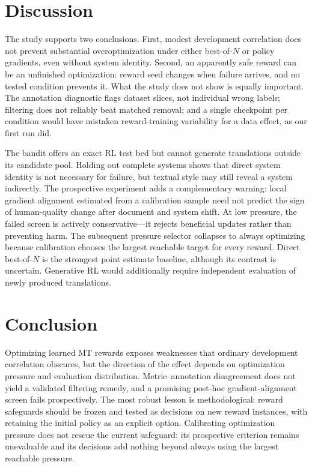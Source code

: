 \documentclass[11pt]{article}
\begin{document}
\section{Discussion}

The study supports two conclusions.  First, modest development correlation
does not prevent substantial overoptimization under either best-of-$N$ or
policy gradients, even without system identity.  Second, an apparently safe
reward can be an unfinished optimization: reward seed changes when failure
arrives, and no tested condition prevents it.  What the study does not show
is equally important.  The annotation diagnostic
flags dataset slices, not individual wrong labels; filtering does not reliably
beat matched removal; and a single checkpoint per condition would have
mistaken reward-training variability for a data effect, as our first run did.

The bandit offers an exact RL test bed but cannot generate translations outside
its candidate pool.  Holding out complete systems shows that direct system
identity is not necessary for failure, but textual style may still reveal a
system indirectly.  The prospective experiment adds a complementary warning:
local gradient alignment estimated from a calibration sample need not predict
the sign of human-quality change after document and system shift.  At low
pressure, the failed screen is actively conservative---it rejects beneficial
updates rather than preventing harm.  The subsequent pressure selector
collapses to always optimizing because calibration chooses the largest
reachable target for every reward.  Direct best-of-$N$ is the strongest point
estimate baseline, although its contrast is uncertain.  Generative RL would additionally require
independent evaluation of newly produced translations.

\section{Conclusion}

Optimizing learned MT rewards exposes weaknesses that ordinary development
correlation obscures, but the direction of the effect depends on optimization
pressure and evaluation distribution.  Metric--annotation disagreement does
not yield a validated filtering remedy, and a promising post-hoc
gradient-alignment screen fails prospectively.  The most robust lesson is
methodological: reward safeguards should be frozen and tested as decisions on
new reward instances, with retaining the initial policy as an explicit option.
Calibrating optimization pressure does not rescue the current safeguard: its
prospective criterion remains unevaluable and its decisions add nothing beyond
always using the largest reachable pressure.
\end{document}
